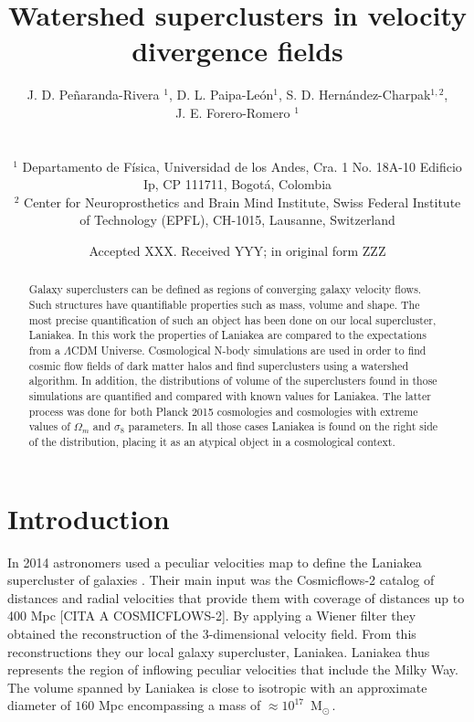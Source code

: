 \documentclass[usenatbib]{mnras}
\title[Watershed superclusters in velocity divergence fields]{Watershed superclusters in velocity divergence fields}
\author[Pe\~naranda-Rivera et al.]{
\parbox[t]{\textwidth}{
    {J. D. Pe\~naranda-Rivera $^1$,} 
    {D. L. Paipa-Le\'on$^{1}$,}
    {S. D. Hern\'andez-Charpak$^{1,2}$,}\\
    {J. E. Forero-Romero $^{1}$}
}
\\\\
$^{1}$ Departamento de F\'isica, Universidad de los Andes, Cra. 1
  No. 18A-10 Edificio Ip, CP 111711, Bogot\'a, Colombia \\
$^{2}$ Center for Neuroprosthetics and Brain Mind Institute, Swiss
  Federal Institute of Technology (EPFL), CH-1015, Lausanne,
  Switzerland\\  
}
\date{Accepted XXX. Received YYY; in original form ZZZ}
\newcommand{\Msun}{\,{\rm M}$_{\odot}$\,}
\begin{document}
\label{firstpage}
\pagerange{\pageref{firstpage}--\pageref{lastpage}}
\maketitle

\maketitle
\begin{abstract}
Galaxy superclusters can be defined as regions of converging galaxy
velocity flows. Such structures have quantifiable properties such as
mass, volume and shape. The most precise quantification of such an
object has been done on our local supercluster, Laniakea. In this work
the properties of Laniakea are compared to the expectations from a
$\Lambda$CDM Universe. Cosmological N-body simulations are used in
order to find cosmic flow fields of dark matter halos and find
superclusters using a watershed algorithm. In addition, the
distributions of volume of the superclusters found in those
simulations are quantified and compared with known values for
Laniakea. The latter process was done for both Planck 2015 cosmologies
and cosmologies with extreme values of $\Omega_m$ and $\sigma_8$
parameters. In all those cases Laniakea is found on the right side of
the distribution, placing it as an atypical object in a cosmological
context.  
\end{abstract}

\begin{keywords}
\end{keywords}




\section{Introduction}


In 2014 astronomers used a peculiar velocities map  to 
define the Laniakea supercluster of galaxies
\citep{2014Natur.513...71T}.  
Their main input was the Cosmicflows-2 catalog of distances and radial
velocities that provide them with coverage of distances up to 400 Mpc
[CITA A COSMICFLOWS-2]. 
By applying a Wiener filter \citep{Zaroubi_1999} they obtained the
reconstruction of the 3-dimensional velocity field. 
From this reconstructions they our local galaxy supercluster, Laniakea.
Laniakea thus represents the region of inflowing peculiar velocities
that include the Milky Way. 
The volume spanned by Laniakea is close to isotropic with an 
approximate diameter of $160$ Mpc encompassing a mass of
$\approx 10^{17}$ \Msun.
\end{document}
